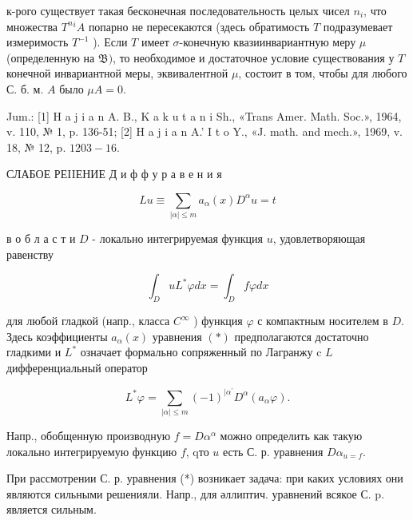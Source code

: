 \documentclass[10pt]{article}
\begin{document}
к-рого существует такая бесконечная последовательность целых чисел $n_{i}$, что множества $T^{n}{ }^{i} A$ попарно не пересекаются (здесь обратимость $T$ подразумевает измеримость $T^{-1}$ ). Если $T$ имеет $\sigma$-конечную квазиинвариантную меру $\mu$ (определенную на $\mathfrak{B})$, то необходимое и достаточное условие существования у $T$ конечной инвариантной меры, эквивалентной $\mu$, состоит в том, чтобы для любого С. б. м. $A$ было $\mu A=0$.



Jum.: [1] H a j i a n A. B., K a k u t a n i Sh., «Trans Amer. Math. Soc.», 1964, v. 110, № 1, p. 136-51; [2] H a j i a n A.' I t o Y., «J. math. and mech.», 1969, v. 18, № 12, p. $1203-16$.



СЛАБОЕ РЕIIЕНИЕ Д и ф ф у р а в е н и я



\[

L u \equiv \sum_{|\alpha| \leqslant m} a_{\alpha}(x) D^{\alpha} u=t

\]



в $о$ б л а с т и $D$ - локально интегрируемая функция $u$, удовлетворяющая равенству



\[

\int_{D} u L^{*} \varphi d x=\int_{D} f \varphi d x

\]



для любой гладкой (напр., класса $C^{\infty}$ ) функция $\varphi$ с компактным носителем в $D$. Здесь коэффициенты $a_{\alpha}(x)$ уравнения $(*)$ предполагаются достаточно гладкими и $L^{*}$ означает формально сопряженный по Лагранжу c $L$ дифференциальный оператор



\[

L^{*} \varphi=\sum_{|\alpha| \leqslant m}(-1)^{\mid \alpha{ }^{\prime}} D^{\alpha}\left(a_{\alpha} \varphi\right) .

\]



Напр., обобщенную производную $f=D \alpha^{\alpha}$ можно определить как такую локально интегрируемую функцию $f$, qто $u$ есть С. р. уравнения $D \alpha_{u=f}$.



При рассмотрении С. р. уравнения (*) возникает задача: при каких условиях они являются сильными решенияли. Напр., для әллиптич. уравнений всякое С. p. является сильным.
\end{document}
